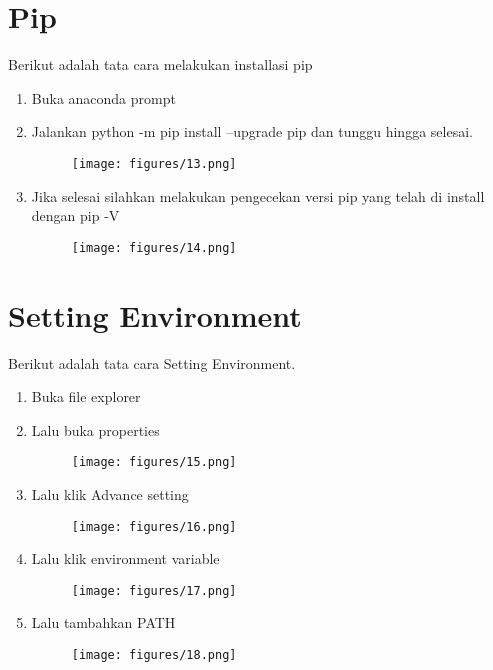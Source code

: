 \section{Pip}
Berikut adalah tata cara melakukan installasi pip
\begin{enumerate}
\item Buka anaconda prompt

\item Jalankan python -m pip install --upgrade pip dan tunggu hingga selesai.
\begin{figure}[H]
    \centering
    \texttt{[image: figures/13.png]}
    \label{13}
\end{figure}

\item Jika selesai silahkan melakukan pengecekan versi pip yang telah di install dengan pip -V
\begin{figure}[H]
    \centering
    \texttt{[image: figures/14.png]}
    \label{14}
\end{figure}
\end{enumerate}

\section{Setting Environment}
Berikut adalah tata cara Setting Environment.
\begin{enumerate}
\item Buka file explorer
\item Lalu buka properties
\begin{figure}[H]
    \centering
    \texttt{[image: figures/15.png]}
    \label{15}
\end{figure}


\item Lalu klik Advance setting
\begin{figure}[H]
    \centering
    \texttt{[image: figures/16.png]}
    \label{16}
\end{figure}


\item Lalu klik environment variable
\begin{figure}[H]
    \centering
    \texttt{[image: figures/17.png]}
    \label{17}
\end{figure}


\item Lalu tambahkan PATH
\begin{figure}[H]
    \centering
    \texttt{[image: figures/18.png]}
    \label{18}
\end{figure}
\end{enumerate}


